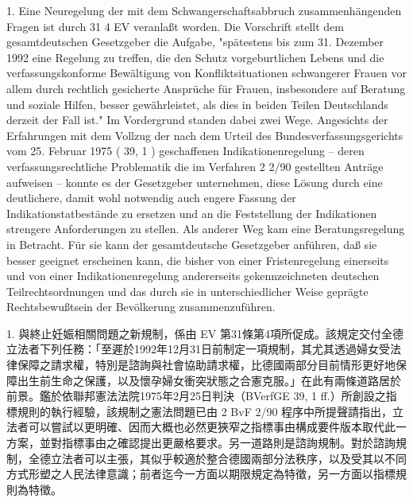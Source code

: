 \documentclass[12pt]{article}
\begin{document}
\begin{sourcepara}[title={原文D.72}]
1. Eine Neuregelung der mit dem Schwangerschaftsabbruch zusammenhängenden Fragen ist durch \abbrArt{} 31 \abbrAbs{} 4 EV veranlaßt worden. Die Vorschrift stellt dem gesamtdeutschen Gesetzgeber die Aufgabe, "spätestens bis zum 31. Dezember 1992 eine Regelung zu treffen, die den Schutz vorgeburtlichen Lebens und die verfassungskonforme Bewältigung von Konfliktsituationen schwangerer Frauen vor allem durch rechtlich gesicherte Ansprüche für Frauen, insbesondere auf Beratung und soziale Hilfen, besser gewährleistet, als dies in beiden Teilen Deutschlands derzeit der Fall ist." Im Vordergrund standen dabei zwei Wege. Angesichts der Erfahrungen mit dem Vollzug der nach dem Urteil des Bundesverfassungsgerichts vom 25. Februar 1975 (\abbrBVerfGE{} 39, 1 \abbrFF{}) geschaffenen Indikationenregelung -- deren verfassungsrechtliche Problematik die im Verfahren 2 \abbrBvF{} 2/90 gestellten Anträge aufweisen -- konnte es der Gesetzgeber unternehmen, diese Lösung durch eine deutlichere, damit wohl notwendig auch engere Fassung der Indikationstatbestände zu ersetzen und an die Feststellung der Indikationen strengere Anforderungen zu stellen. Als anderer Weg kam eine Beratungsregelung in Betracht. Für sie kann der gesamtdeutsche Gesetzgeber anführen, daß sie besser geeignet erscheinen kann, die bisher von einer Fristenregelung einerseits und von einer Indikationenregelung andererseits gekennzeichneten deutschen Teilrechtsordnungen und das durch sie in unterschiedlicher Weise geprägte Rechtsbewußtsein der Bevölkerung zusammenzuführen.
\end{sourcepara}
\begin{transpara}
1. 與終止妊娠相關問題之新規制，係由 EV 第31條第4項所促成。該規定交付全德立法者下列任務：「至遲於1992年12月31日前制定一項規制，其尤其透過婦女受法律保障之請求權，特別是諮詢與社會協助請求權，比德國兩部分目前情形更好地保障出生前生命之保護，以及懷孕婦女衝突狀態之合憲克服。」在此有兩條道路居於前景。鑑於依聯邦憲法法院1975年2月25日判決（BVerfGE 39, 1 ff.）所創設之指標規則的執行經驗，該規制之憲法問題已由 2 BvF 2/90 程序中所提聲請指出，立法者可以嘗試以更明確、因而大概也必然更狹窄之指標事由構成要件版本取代此一方案，並對指標事由之確認提出更嚴格要求。另一道路則是諮詢規制。對於諮詢規制，全德立法者可以主張，其似乎較適於整合德國兩部分法秩序，以及受其以不同方式形塑之人民法律意識；前者迄今一方面以期限規定為特徵，另一方面以指標規則為特徵。
\end{transpara}
\end{document}
